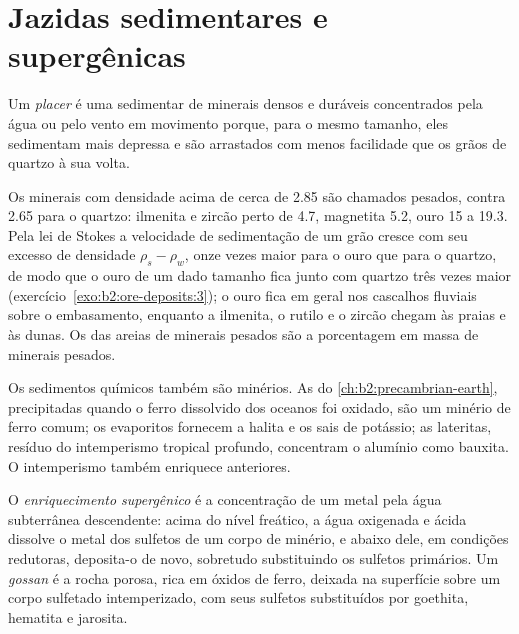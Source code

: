 \section{Jazidas sedimentares e supergênicas}\label{sec:b2:ore-deposits:sedimentary}

\begin{definition}\label{def:b2:ore-deposits:placer}
Um \emph{placer} é uma  sedimentar de minerais densos e duráveis concentrados pela
água ou pelo vento em movimento porque, para o mesmo tamanho, eles sedimentam mais depressa e são arrastados com menos facilidade
que os grãos de quartzo à sua volta.
\end{definition}

Os minerais com densidade acima de cerca de 2.85 são chamados pesados, contra 2.65 para o quartzo: ilmenita e zircão
perto de 4.7, magnetita 5.2, ouro 15 a 19.3. Pela lei de Stokes a velocidade de sedimentação de um grão cresce com
seu excesso de densidade $\rho_s - \rho_w$, onze vezes maior para o ouro que para o quartzo, de modo que o ouro de um
dado tamanho fica junto com quartzo três vezes maior (exercício~\ref{exo:b2:ore-deposits:3}); o ouro
fica em geral nos cascalhos fluviais sobre o embasamento, enquanto a ilmenita, o rutilo e o zircão chegam às praias e às
dunas. Os  das areias de minerais pesados são a porcentagem em massa de minerais pesados.

Os sedimentos químicos também são minérios. As  do \cref{ch:b2:precambrian-earth},
precipitadas quando o ferro dissolvido dos oceanos foi oxidado, são um minério de ferro comum; os evaporitos
fornecem a halita e os sais de potássio; as lateritas, resíduo do intemperismo tropical profundo,
concentram o alumínio como bauxita. O intemperismo também enriquece  anteriores.

\begin{definition}\label{def:b2:ore-deposits:supergene}
O \emph{enriquecimento supergênico} é a concentração de um metal pela
água subterrânea descendente: acima do nível freático, a água oxigenada e ácida dissolve o metal dos
sulfetos de um corpo de minério, e abaixo dele, em condições redutoras, deposita-o de novo, sobretudo
substituindo os sulfetos primários. Um \emph{gossan} é a rocha porosa, rica em óxidos de ferro,
deixada na superfície sobre um corpo sulfetado intemperizado, com seus sulfetos substituídos por goethita, hematita e
jarosita.
\end{definition}

